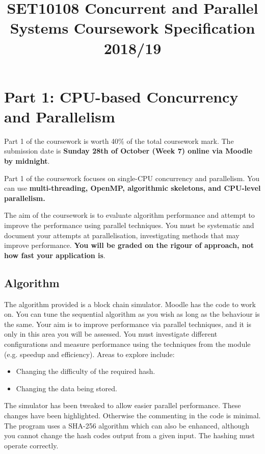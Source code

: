 \documentclass[a4paper, 12pt]{article}
\title{SET10108 Concurrent and Parallel Systems Coursework Specification 2018/19}
\author{}
\date{}
\begin{document}
\maketitle

\section*{Part 1: CPU-based Concurrency and Parallelism}

Part 1 of the coursework is worth 40\% of the total coursework mark. The submission date is {\bfseries Sunday 28th of October (Week 7) online via Moodle by midnight}. 

Part 1 of the coursework focuses on single-CPU concurrency and parallelism. You can use {\bfseries multi-threading, OpenMP, algorithmic skeletons, and CPU-level parallelism.}

The aim of the coursework is to evaluate algorithm performance and attempt to improve the performance using parallel techniques. You must be systematic and document your attempts at parallelisation, investigating methods that may improve performance. {\bfseries You will be graded on the rigour of approach, not how fast your application is}.

\subsection*{Algorithm}

The algorithm provided is a block chain simulator. Moodle has the code to work on. You can tune the sequential algorithm as you wish as long as the behaviour is the same. Your aim is to improve performance via parallel techniques, and it is only in this area you will be assessed.  You must investigate different configurations and measure performance using the
techniques from the module (e.g. speedup and efficiency). Areas to explore include:

\begin{itemize}
	\item Changing the difficulty of the required hash.
	\item Changing the data being stored.
\end{itemize}

The simulator has been tweaked to allow easier parallel performance.  These changes have been highlighted.  Otherwise the commenting in the code is minimal.  The program uses a SHA-256 algorithm which can also be enhanced, although you cannot change the hash codes output from a given input.  The hashing must operate correctly.
\end{document}
